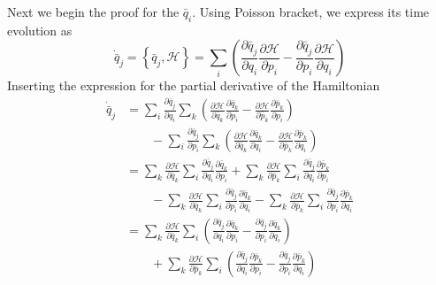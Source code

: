 \documentclass[../../../main.tex]{subfiles}
\begin{document}
Next we begin the proof for the $\bar{q}_i$.
Using Poisson bracket, we express its time evolution as
\begin{equation*}
	\dot{\bar{q}}_j=\left\{ \bar{q }_j,\mathcal{H} \right\}=\sum_i \left( \frac{\partial \bar{q }_j }{\partial q_i }\frac{\partial \mathcal{H } }{\partial p_i }-\frac{\partial \bar{q }_j }{\partial p_i }\frac{\partial \mathcal{H } }{\partial q_i} \right)
\end{equation*}
Inserting the expression for the partial derivative of the Hamiltonian
\begin{align*}
	\dot{\bar{q }}_j & = \sum_i \frac{\partial \bar{q }_j }{\partial q_i } 	\sum_k \left( \frac{\partial \mathcal{H }}{\partial \bar{q }_k }\frac{\partial \bar{q }_k }{\partial p_i }-\frac{\partial \mathcal{H }}{\partial \bar{p }_k }\frac{\partial \bar{p }_k }{\partial p_i } \right)     \\
	                 & \qquad-\sum_i \frac{\partial \bar{q }_j }{\partial p_i }	\sum_k \left( \frac{\partial \mathcal{H }}{\partial \bar{q }_k }\frac{\partial \bar{q }_k }{\partial q_i }-\frac{\partial \mathcal{H }}{\partial \bar{p }_k }\frac{\partial \bar{p }_k }{\partial q_i } \right) \\
	                 & = \sum_k \frac{\partial \mathcal{H }}{\partial \bar{q }_k }\sum_i \frac{\partial \bar{q }_j }{\partial q_i}\frac{\partial \bar{q }_k }{\partial p_i}
	+ \sum_k \frac{\partial \mathcal{H }}{\partial \bar{p }_k }\sum_i \frac{\partial \bar{q }_j }{\partial q_i}\frac{\partial \bar{p }_k }{\partial p_i}                                                                                                                                        \\
	                 & \qquad
	-\sum_k \frac{\partial \mathcal{H }}{\partial \bar{q }_k }\sum_i \frac{\partial \bar{q }_j }{\partial p_i}\frac{\partial \bar{q }_k }{\partial q_i}
	-\sum_k \frac{\partial \mathcal{H }}{\partial \bar{p }_k }\sum_i \frac{\partial \bar{q }_j }{\partial p_i}\frac{\partial \bar{p }_k }{\partial q_i}                                                                                                                                         \\
	                 & = \sum_k \frac{\partial \mathcal{H }}{\partial \bar{q }_k }\sum_i 	\left( \frac{\partial \bar{q }_j }{\partial q_i }\frac{\partial \bar{q }_k }{\partial p_i} -\frac{\partial \bar{q }_j }{\partial p_i }\frac{\partial \bar{q }_k }{\partial q_i}\right)                \\
	                 & \qquad+\sum_k \frac{\partial \mathcal{H }}{\partial \bar{p }_k }\sum_i 	\left( \frac{\partial \bar{q }_j }{\partial q_i }\frac{\partial \bar{p }_k }{\partial p_i} -\frac{\partial \bar{q }_j }{\partial p_i }\frac{\partial \bar{p }_k }{\partial q_i}\right)           \\

\end{align*}
\end{document}
